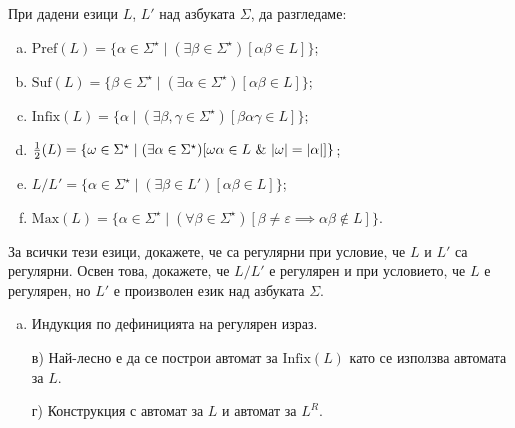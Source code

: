 \begin{problem}
  При дадени езици $L$, $L'$ над азбуката $\Sigma$, да разгледаме:
  \begin{enumerate}[a)]
  \item
    $\mbox{Pref}(L) = \{\alpha \in \Sigma^\star \mid (\exists \beta \in \Sigma^\star)[\alpha\beta \in L]\}$;
  \item
    $\mbox{Suf}(L) = \{\beta \in \Sigma^\star \mid (\exists \alpha \in \Sigma^\star)[\alpha\beta \in L]\}$;
  \item
    $\text{Infix}(L) = \{\alpha \mid (\exists \beta,\gamma \in \Sigma^\star)[\beta\alpha\gamma \in L]\}$;
  \item 
    $\frac{1}{2}(L) = \{\omega \in \Sigma^\star \mid (\exists \alpha \in \Sigma^\star)[\omega\alpha \in L\ \&\ \abs{\omega} = \abs{\alpha}]\}$;
  \item
    $L/L' = \{\alpha \in \Sigma^\star \mid (\exists \beta \in L')[\alpha\beta \in L]\}$;
  \item
    $\mbox{Max}(L) = \{\alpha \in \Sigma^\star \mid (\forall \beta\in\Sigma^\star)[\beta \neq \varepsilon\implies \alpha\beta \not\in L]\}$.
  \end{enumerate}
  За всички тези езици, докажете, че са регулярни при условие, че $L$ и $L'$ са регулярни.
  Освен това, докажете, че $L/L'$ е регулярен и при условието, че $L$ е регулярен, но $L'$ е произволен език над азбуката $\Sigma$.
\end{problem}
\begin{hint}
  \begin{enumerate}[a)]
  \item 
    Индукция по дефиницията на регулярен израз.
  \item[в)]
    Най-лесно е да се построи автомат за $\text{Infix}(L)$ като се използва автомата за $L$.
  \item[г)]
    Конструкция с автомат за $L$ и автомат за $L^R$.
  \end{enumerate}
\end{hint}


